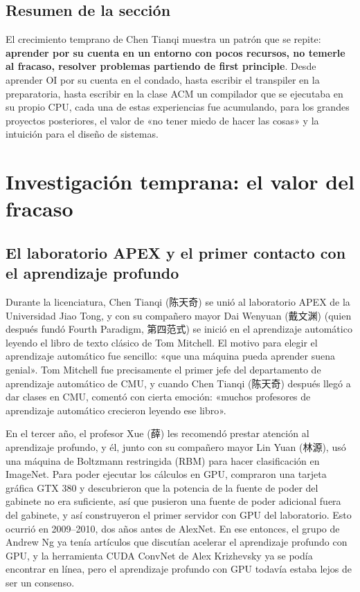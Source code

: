 \documentclass[a4paper]{article}
\begin{document}
\subsection{Resumen de la sección}

El crecimiento temprano de Chen Tianqi muestra un patrón que se repite: \textbf{aprender por su cuenta en un entorno con pocos recursos, no temerle al fracaso, resolver problemas partiendo de first principle}. Desde aprender OI por su cuenta en el condado, hasta escribir el transpiler en la preparatoria, hasta escribir en la clase ACM un compilador que se ejecutaba en su propio CPU, cada una de estas experiencias fue acumulando, para los grandes proyectos posteriores, el valor de «no tener miedo de hacer las cosas» y la intuición para el diseño de sistemas.
\section{Investigación temprana: el valor del fracaso}

\subsection{El laboratorio APEX y el primer contacto con el aprendizaje profundo}

Durante la licenciatura, Chen Tianqi (陈天奇) se unió al laboratorio APEX de la Universidad Jiao Tong, y con su compañero mayor Dai Wenyuan (戴文渊) (quien después fundó Fourth Paradigm, 第四范式) se inició en el aprendizaje automático leyendo el libro de texto clásico de Tom Mitchell. El motivo para elegir el aprendizaje automático fue sencillo: «que una máquina pueda aprender suena genial». Tom Mitchell fue precisamente el primer jefe del departamento de aprendizaje automático de CMU, y cuando Chen Tianqi (陈天奇) después llegó a dar clases en CMU, comentó con cierta emoción: «muchos profesores de aprendizaje automático crecieron leyendo ese libro».

En el tercer año, el profesor Xue (薛) les recomendó prestar atención al aprendizaje profundo, y él, junto con su compañero mayor Lin Yuan (林源), usó una máquina de Boltzmann restringida (RBM) para hacer clasificación en ImageNet. Para poder ejecutar los cálculos en GPU, compraron una tarjeta gráfica GTX 380 y descubrieron que la potencia de la fuente de poder del gabinete no era suficiente, así que pusieron una fuente de poder adicional fuera del gabinete, y así construyeron el primer servidor con GPU del laboratorio. Esto ocurrió en 2009--2010, dos años antes de AlexNet. En ese entonces, el grupo de Andrew Ng ya tenía artículos que discutían acelerar el aprendizaje profundo con GPU, y la herramienta CUDA ConvNet de Alex Krizhevsky ya se podía encontrar en línea, pero el aprendizaje profundo con GPU todavía estaba lejos de ser un consenso.
\end{document}
